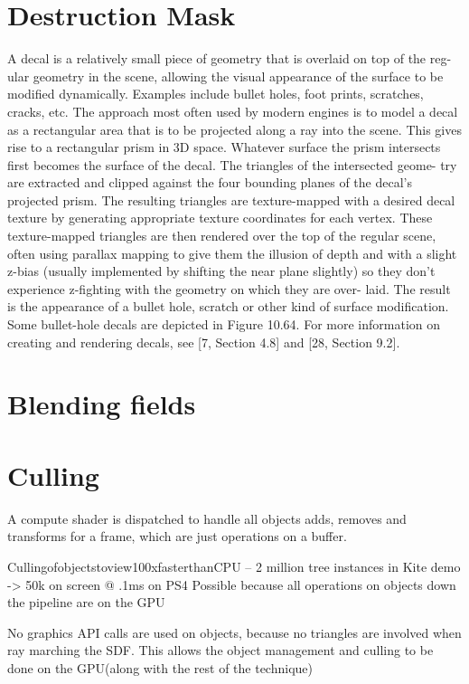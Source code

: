 \chapter{Destruction Mask}

A decal is a relatively small piece of geometry that is overlaid on top of the reg- ular geometry in the scene, allowing the visual appearance of the surface to be modified dynamically. Examples include bullet holes, foot prints, scratches, cracks, etc.
The approach most often used by modern engines is to model a decal as a rectangular area that is to be projected along a ray into the scene. This gives rise to a rectangular prism in 3D space. Whatever surface the prism intersects first becomes the surface of the decal. The triangles of the intersected geome- try are extracted and clipped against the four bounding planes of the decal’s projected prism. The resulting triangles are texture-mapped with a desired decal texture by generating appropriate texture coordinates for each vertex. These texture-mapped triangles are then rendered over the top of the regular scene, often using parallax mapping to give them the illusion of depth and with a slight z-bias (usually implemented by shifting the near plane slightly) so they don’t experience z-fighting with the geometry on which they are over- laid. The result is the appearance of a bullet hole, scratch or other kind of surface modification. Some bullet-hole decals are depicted in Figure 10.64.
For more information on creating and rendering decals, see [7, Section 4.8] and [28, Section 9.2].




\chapter{Blending fields}
\chapter{Culling}
A compute shader is dispatched to handle all objects adds, removes and transforms for a frame, which are just operations on a buffer.


 Cullingofobjectstoview100xfasterthanCPU
– 2 million tree instances in Kite demo -> 50k on screen @ .1ms on PS4
Possible because all operations on objects down the pipeline are on the GPU
 
 
 No graphics API calls are used on objects, because no triangles are involved when ray marching the SDF. This allows the object management and culling to be done on the GPU(along with the rest of the technique)

